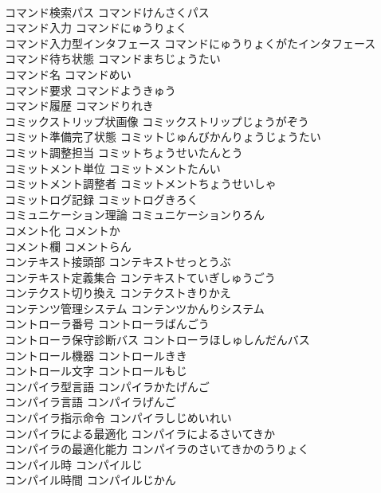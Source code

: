 \documentclass[8pt]{extreport}
\begin{document}
\begin{CJK}{UTF8}{min}
\\	コマンド検索パス	コマンドけんさくパス	
\\	コマンド入力	コマンドにゅうりょく	
\\	コマンド入力型インタフェース	コマンドにゅうりょくがたインタフェース	
\\	コマンド待ち状態	コマンドまちじょうたい	
\\	コマンド名	コマンドめい	
\\	コマンド要求	コマンドようきゅう	
\\	コマンド履歴	コマンドりれき	
\\	コミックストリップ状画像	コミックストリップじょうがぞう	
\\	コミット準備完了状態	コミットじゅんびかんりょうじょうたい	
\\	コミット調整担当	コミットちょうせいたんとう	
\\	コミットメント単位	コミットメントたんい	
\\	コミットメント調整者	コミットメントちょうせいしゃ	
\\	コミットログ記録	コミットログきろく	
\\	コミュニケーション理論	コミュニケーションりろん	
\\	コメント化	コメントか	
\\	コメント欄	コメントらん	
\\	コンテキスト接頭部	コンテキストせっとうぶ	
\\	コンテキスト定義集合	コンテキストていぎしゅうごう	
\\	コンテクスト切り換え	コンテクストきりかえ	
\\	コンテンツ管理システム	コンテンツかんりシステム	
\\	コントローラ番号	コントローラばんごう	
\\	コントローラ保守診断バス	コントローラほしゅしんだんバス	
\\	コントロール機器	コントロールきき	
\\	コントロール文字	コントロールもじ	
\\	コンパイラ型言語	コンパイラかたげんご	
\\	コンパイラ言語	コンパイラげんご	
\\	コンパイラ指示命令	コンパイラしじめいれい	
\\	コンパイラによる最適化	コンパイラによるさいてきか	
\\	コンパイラの最適化能力	コンパイラのさいてきかのうりょく	
\\	コンパイル時	コンパイルじ	
\\	コンパイル時間	コンパイルじかん	

\end{CJK}
\end{document}
